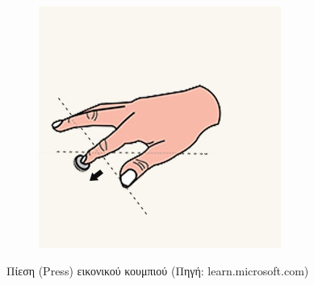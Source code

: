 \begin{enumerate}
\begin{figure}[!ht]
\begin{subfigure}{0.25\textwidth}
        \end{subfigure}%
        \begin{subfigure}{0.25\textwidth}
            \centering
            \includegraphics[width=0.9\linewidth]{images/hololens_interaction_press_step4.jpg}
        \end{subfigure}%
        \caption{Πίεση (Press) εικονικού κουμπιού {\footnotesize (Πηγή: learn.microsoft.com)}}\label{fig:hololensInteractionPress}
    \end{figure}


\end{enumerate}
